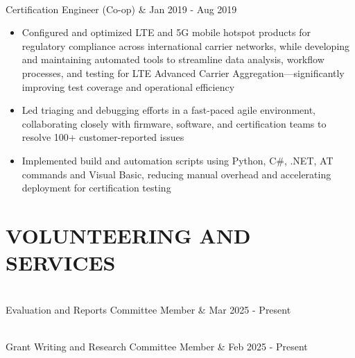 \documentclass[letterpaper,11pt]{article} %
\newcommand{\resumeItem}[1]{\small{#1}\vspace{-5pt}}
\begin{document}
\vspace{-15pt}
\begin{tabular*}
    \\
    {Certification Engineer (Co-op)} & {\color{TextBlack} \small Jan 2019 - Aug 2019}\\
\end{tabular*}
\vspace{-10pt}
\begin{itemize}
    \item\resumeItem{Configured and optimized LTE and 5G mobile hotspot products for regulatory compliance across international carrier networks, while developing and maintaining automated tools to streamline data analysis, workflow processes, and testing for LTE Advanced Carrier Aggregation—significantly improving test coverage and operational efficiency}
    \item\resumeItem{Led triaging and debugging efforts in a fast-paced agile environment, collaborating closely with firmware, software, and certification teams to resolve 100+ customer-reported issues}
    \item\resumeItem{Implemented build and automation scripts using Python, C\#, .NET, AT commands and Visual Basic, reducing manual overhead and accelerating deployment for certification testing}
\end{itemize}

\section{VOLUNTEERING AND SERVICES}\label{volunteering-and-services}

\vspace{-5pt}

\vspace{5pt}
\begin{tabular*}
    \vspace{1pt}\\
    {Evaluation and Reports Committee Member} & {\color{TextBlack} \small Mar 2025 - Present}\\
\end{tabular*}

\vspace{-12.5pt}
\begin{tabular*}
    \\
    {Grant Writing and Research Committee Member} & {\color{TextBlack} \small Feb 2025 - Present}\\
\end{tabular*}
\end{document}
